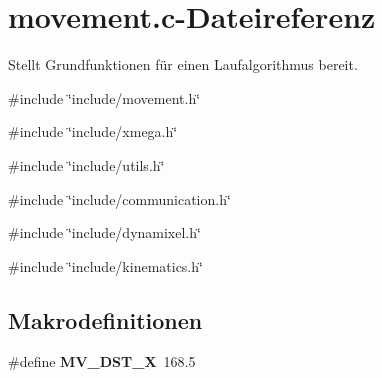 \section{movement.c-\/Dateireferenz}
\label{movement_8c}


Stellt Grundfunktionen für einen Laufalgorithmus bereit.  


{\ttfamily \#include \char`\"{}include/movement.h\char`\"{}}\par
{\ttfamily \#include \char`\"{}include/xmega.h\char`\"{}}\par
{\ttfamily \#include \char`\"{}include/utils.h\char`\"{}}\par
{\ttfamily \#include \char`\"{}include/communication.h\char`\"{}}\par
{\ttfamily \#include \char`\"{}include/dynamixel.h\char`\"{}}\par
{\ttfamily \#include \char`\"{}include/kinematics.h\char`\"{}}\par
\subsection*{Makrodefinitionen}
\begin{DoxyCompactItemize}
\item 
\#define {\bf MV\_\-DST\_\-X}~168.5
\end{DoxyCompactItemize}
